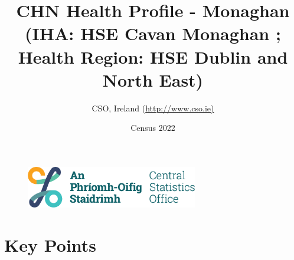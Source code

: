 \documentclass{article}
\title{CHN Health Profile - Monaghan (IHA: HSE Cavan Monaghan ;  Health Region: HSE Dublin and North East) }
\date{Census 2022}
\author{CSO, Ireland  (\url{http://www.cso.ie)}}
\begin{document}


\begin{figure}
	\centering
\includegraphics[width =75mm]{../figures/CSO_Logo.png}
\end{figure}

				 
		   
						  
														  
																																													
												 
			 
\maketitle
					
													   
				 
						 
																																																																											   
				 
				  
  \pagebreak
    	    \tableofcontents

\pagebreak


\section{Key Points}
\end{document}

